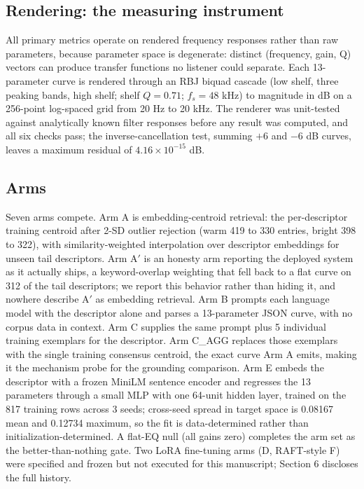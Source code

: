 \documentclass[11pt]{article}
\begin{document}
\subsection{Rendering: the measuring instrument}

All primary metrics operate on rendered frequency responses rather than raw parameters, because parameter space is degenerate: distinct (frequency, gain, Q) vectors can produce transfer functions no listener could separate. Each 13-parameter curve is rendered through an RBJ biquad cascade (low shelf, three peaking bands, high shelf; shelf $Q = 0.71$; $f_s = 48$ kHz) to magnitude in dB on a 256-point log-spaced grid from 20 Hz to 20 kHz. The renderer was unit-tested against analytically known filter responses before any result was computed, and all six checks pass; the inverse-cancellation test, summing $+6$ and $-6$ dB curves, leaves a maximum residual of $4.16\times10^{-15}$ dB.

\subsection{Arms}

Seven arms compete. Arm A is embedding-centroid retrieval: the per-descriptor training centroid after 2-SD outlier rejection (warm 419 to 330 entries, bright 398 to 322), with similarity-weighted interpolation over descriptor embeddings for unseen tail descriptors. Arm A$'$ is an honesty arm reporting the deployed system as it actually ships, a keyword-overlap weighting that fell back to a flat curve on 312 of the tail descriptors; we report this behavior rather than hiding it, and nowhere describe A$'$ as embedding retrieval. Arm B prompts each language model with the descriptor alone and parses a 13-parameter JSON curve, with no corpus data in context. Arm C supplies the same prompt plus 5 individual training exemplars for the descriptor. Arm C\_AGG replaces those exemplars with the single training consensus centroid, the exact curve Arm A emits, making it the mechanism probe for the grounding comparison. Arm E embeds the descriptor with a frozen MiniLM sentence encoder and regresses the 13 parameters through a small MLP with one 64-unit hidden layer, trained on the 817 training rows across 3 seeds; cross-seed spread in target space is 0.08167 mean and 0.12734 maximum, so the fit is data-determined rather than initialization-determined. A flat-EQ null (all gains zero) completes the arm set as the better-than-nothing gate. Two LoRA fine-tuning arms (D, RAFT-style F) were specified and frozen but not executed for this manuscript; Section 6 discloses the full history.
\end{document}
